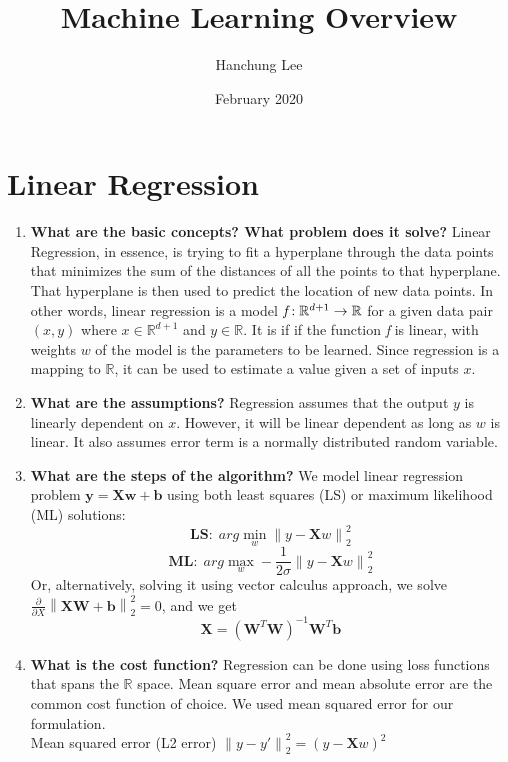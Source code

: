 \documentclass{article}
\title{Machine Learning Overview}
\author{Hanchung Lee}
\date{February 2020}
\begin{document}
\maketitle

\section{Linear Regression}

\noindent
\begin{enumerate}
    \item \textbf{What are the basic concepts? What problem does it solve?}
    \noindent 
    \smallbreak
    Linear Regression, in essence, is trying to fit a hyperplane through the data points that minimizes the sum of the distances of all the points to that hyperplane. That hyperplane is then used to predict the location of new data points. In other words, linear regression is a model $\emph{f} : \mathbb{R}^{d+1} \rightarrow \mathbb{R}$ for a given data pair $(x, y)$ where $x \in \mathbb{R}^{d+1}$ and $y \in \mathbb{R}$. It is if if the function \emph{f} is linear, with weights $w$ of the model is the parameters to be learned. Since regression is a mapping to $\mathbb{R}$, it can be used to estimate a value given a set of inputs $x$.
    
    \item \textbf{What are the assumptions?}
    \noindent 
    \smallbreak
    Regression assumes that the output $y$ is linearly dependent on $x$. However, it will be linear dependent as long as $w$ is linear. It also assumes error term is a normally distributed random variable.
    
    \item \textbf{What are the steps of the algorithm?}
    \noindent 
    \smallbreak
    We model linear regression problem $\mathbf{y} = \mathbf{X}\mathbf{w} + \mathbf{b}$ using both least squares (LS) or maximum likelihood (ML) solutions:
    $$\mathbf{LS}: \; arg \min_{w} \left\|y - \mathbf{X}w\right\|_{2}^{2}$$
    $$\mathbf{ML}: \; arg \max_{w} -\frac{1}{2\sigma}\left\|y - \mathbf{X}w\right\|_{2}^{2}$$
    Or, alternatively, solving it using vector calculus approach, we solve $\frac{\partial}{\partial{X}}\left\|\mathbf{X}\mathbf{W} + \mathbf{b}\right\|_{2}^{2} = 0$, and we get
    $$\mathbf{X} = (\mathbf{W}^T\mathbf{W})^{-1}\mathbf{W}^T\mathbf{b}$$
    
    \item \textbf{What is the cost function?}
    \noindent 
    \smallbreak
    Regression can be done using loss functions that spans the $\mathbb{R}$ space. Mean square error and mean absolute error are the common cost function of choice. We used mean squared error for our formulation.\\
    \smallbreak
    Mean squared error (L2 error)  $\left\|y - y'\right\|_{2}^2 = (y - \mathbf{X}w)^2$ \\ 
    

\end{enumerate}
\end{document}
